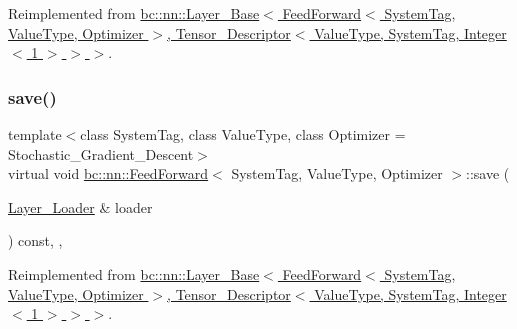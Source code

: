 Reimplemented from \hyperlink{structbc_1_1nn_1_1Layer__Base_a5b3a9854215815f810bef4922b74efaf}{bc\+::nn\+::\+Layer\+\_\+\+Base$<$ Feed\+Forward$<$ System\+Tag, Value\+Type, Optimizer $>$, Tensor\+\_\+\+Descriptor$<$ Value\+Type, System\+Tag, Integer$<$ 1 $>$ $>$ $>$}.

\mbox{\label{structbc_1_1nn_1_1FeedForward_afd962933712eacd56880bbba0fb5948b}} 
\subsubsection{\texorpdfstring{save()}{save()}}
{\footnotesize\ttfamily template$<$class System\+Tag, class Value\+Type, class Optimizer = Stochastic\+\_\+\+Gradient\+\_\+\+Descent$>$ \\
virtual void \hyperlink{structbc_1_1nn_1_1FeedForward}{bc\+::nn\+::\+Feed\+Forward}$<$ System\+Tag, Value\+Type, Optimizer $>$\+::save (\begin{DoxyParamCaption}\item[{\hyperlink{structbc_1_1nn_1_1Layer__Loader}{Layer\+\_\+\+Loader} \&}]{loader }\end{DoxyParamCaption}) const\hspace{0.3cm}{\ttfamily [inline]}, {\ttfamily [override]}, {\ttfamily [virtual]}}



Reimplemented from \hyperlink{structbc_1_1nn_1_1Layer__Base_a9613e51db3c27e64ced09e41d2e7f15c}{bc\+::nn\+::\+Layer\+\_\+\+Base$<$ Feed\+Forward$<$ System\+Tag, Value\+Type, Optimizer $>$, Tensor\+\_\+\+Descriptor$<$ Value\+Type, System\+Tag, Integer$<$ 1 $>$ $>$ $>$}.

\mbox{\label{structbc_1_1nn_1_1FeedForward_a9a3f78006d1796787166bd1bc278b13f}} 
